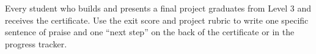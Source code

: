 \begin{teachernote}
Every student who builds and presents a final project graduates from Level 3 and receives the
certificate. Use the exit score and project rubric to write one specific sentence of praise and
one \enquote{next step} on the back of the certificate or in the progress tracker.
\end{teachernote}
